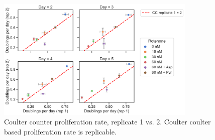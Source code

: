 \begin{figure}[ht]
    \centering
    \includegraphics[width=0.85\textwidth]{figures/sapp/IC/prlfr_CCvsCC-byday.pdf}
    \caption[Coulter counter proliferation rate, replicate 1 vs. 2.]{
    Coulter counter proliferation rate, replicate 1 vs. 2.
    Coulter coulter based proliferation rate is replicable.
    }
    \label{fig:sapp:IC:CCvsCC2}
\end{figure}





